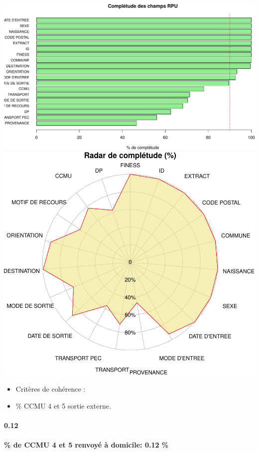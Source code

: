 \documentclass[]{article}
\begin{document}
\includegraphics{rapport_2014_files/figure-latex/completude-1.pdf}
\includegraphics{rapport_2014_files/figure-latex/completude-2.pdf}

\begin{itemize}
\item
  Critères de cohérence :
\item
  \% CCMU 4 et 5 sortie externe.
\end{itemize}

\paragraph{0.12}\label{section}

\paragraph{\% de CCMU 4 et 5 renvoyé à domicile: 0.12
\%}\label{de-ccmu-4-et-5-renvoye-a-domicile-0.12}
\end{document}
